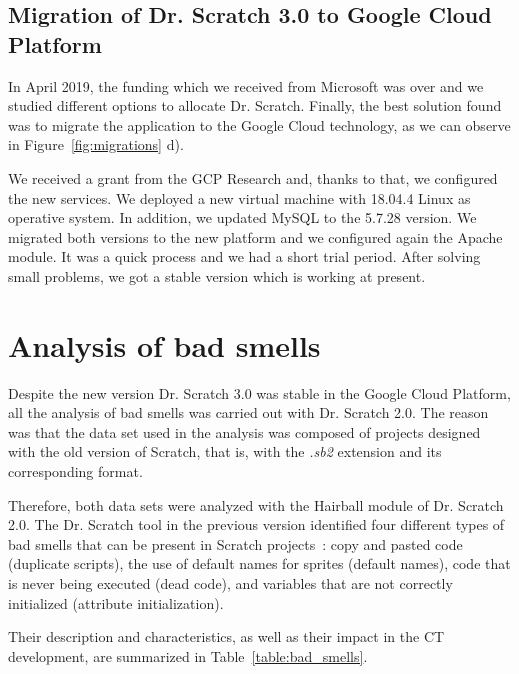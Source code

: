 \subsection{Migration of Dr. Scratch 3.0 to Google Cloud Platform}
\label{subsec:mig_to_google}

In April 2019, the funding which we received from Microsoft was over and we studied different options to allocate Dr. Scratch. Finally, the best solution found was to migrate the application to the Google Cloud technology, as we can observe in Figure~\ref{fig:migrations} d).
 
We received a grant from the GCP Research and, thanks to that, we configured the new services. We deployed a new virtual machine with 18.04.4 Linux as operative system. In addition, we updated MySQL to the 5.7.28 version. We migrated both versions to the new platform and we configured again the Apache module. It was a quick process and we had a short trial period. After solving small problems, we got a stable version which is working at present.


\section{Analysis of bad smells}
\label{sec:analysis}

Despite the new version Dr. Scratch 3.0 was stable in the Google Cloud Platform, all the analysis of bad smells was carried out with Dr. Scratch 2.0. The reason was that the data set used in the analysis was composed of projects designed with the old version of Scratch, that is, with the \textit{.sb2} extension and its corresponding format.

Therefore, both data sets were analyzed with the Hairball module of Dr. Scratch 2.0. The Dr. Scratch tool in the previous version identified four different types of bad smells that can be present in Scratch projects~\cite{robles2017software}: copy and pasted code (duplicate scripts), the use of default names for sprites (default names), code that is never being executed (dead code), and variables that are not correctly initialized (attribute initialization).

Their description and characteristics, as well as their impact in the CT development, are summarized in Table~\ref{table:bad_smells}.

